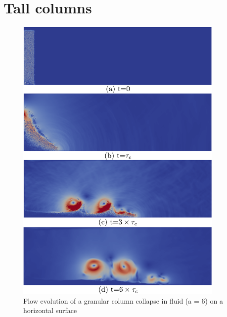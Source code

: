\section{Tall columns}

\begin{figure}[htpb]
\centering
\includegraphics[width=0.9\textwidth]{LBM_DEM_a6}
\caption{Flow evolution of a granular column collapse in fluid (a = 6) on a 
horizontal surface}
\label{fig:LBM_DEM_a6}
\end{figure}


